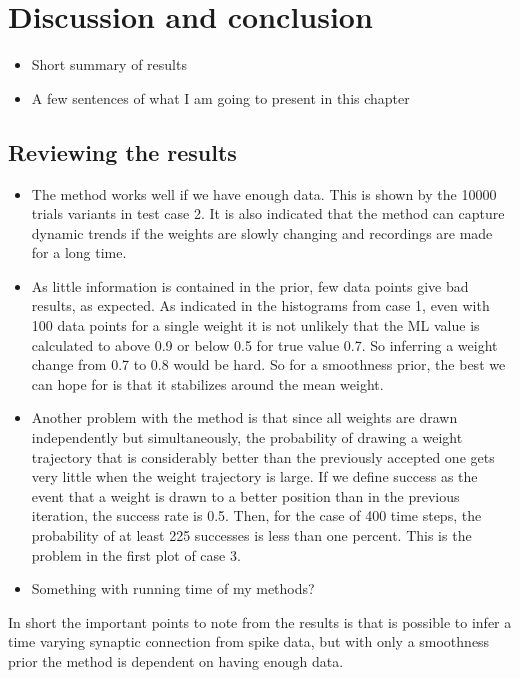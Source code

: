 
\chapter{Discussion and conclusion}

\begin{itemize}
    \item Short summary of results
    \item A few sentences of what I am going to present in this chapter
\end{itemize}

\section{Reviewing the results}

\begin{itemize}
    \item The method works well if we have enough data. This is shown by the 10000 trials variants in test case 2. It is also indicated that the method can capture dynamic trends if the weights are slowly changing and recordings are made for a long time.
    \item As little information is contained in the prior, few data points give bad results, as expected. As indicated in the histograms from case 1, even with 100 data points for a single weight it is not unlikely that the ML value is calculated to above 0.9 or below 0.5 for true value 0.7. So inferring a weight change from 0.7 to 0.8 would be hard. So for a smoothness prior, the best we can hope for is that it stabilizes around the mean weight. 
    \item Another problem with the method is that since all weights are drawn independently but simultaneously, the probability of drawing a weight trajectory that is considerably better than the previously accepted one gets very little when the weight trajectory is large. If we define success as the event that a weight is drawn to a better position than in the previous iteration, the success rate is 0.5. Then, for the case of 400 time steps, the probability of at least 225 successes is less than one percent. This is the problem in the first plot of case 3.  
    \item Something with running time of my methods?
\end{itemize}
In short the important points to note from the results is that is possible to infer a time varying synaptic connection from spike data, but with only a smoothness prior the method is dependent on having enough data. 



